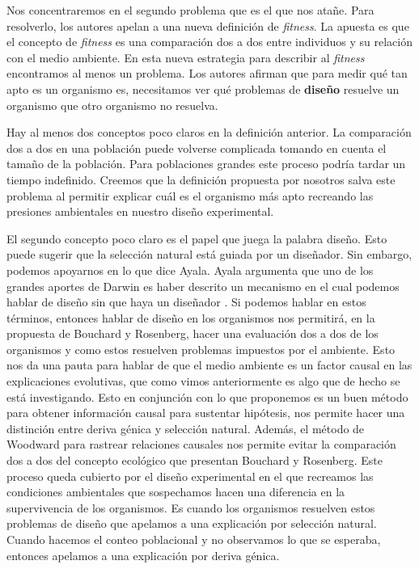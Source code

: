 Nos concentraremos en el segundo problema que es el que nos atañe. Para resolverlo, los autores apelan a una nueva definición de \emph{fitness}. La apuesta es que el concepto de \emph{fitness} es una comparación dos a dos entre individuos y su relación con el medio ambiente. En esta nueva estrategia para describir al \emph{fitness} encontramos al menos un problema. Los autores afirman que para medir qué tan apto es un organismo es, necesitamos ver qué problemas de \textbf{diseño} resuelve un organismo que otro organismo no resuelva.

Hay al menos dos conceptos poco claros en la definición anterior. La comparación dos a dos en una población puede volverse complicada tomando en cuenta el tamaño de la población. Para poblaciones grandes este proceso podría tardar un tiempo indefinido. Creemos que la definición propuesta por nosotros salva este problema al permitir explicar cuál es el organismo más apto recreando las presiones ambientales en nuestro diseño experimental.

El segundo concepto poco claro es el papel que juega la palabra diseño. Esto puede sugerir que la selección natural está guiada por un diseñador. Sin embargo, podemos apoyarnos en lo que dice Ayala. Ayala argumenta que uno de los grandes aportes de Darwin es haber descrito un mecanismo en el cual podemos hablar de diseño sin que haya un diseñador \cite{Ayala2004}. Si podemos hablar en estos términos, entonces hablar de diseño en los organismos nos permitirá, en la propuesta de Bouchard y Rosenberg, hacer una evaluación dos a dos de los organismos y como estos resuelven problemas impuestos por el ambiente. Esto nos da una pauta para hablar de que el medio ambiente es un factor causal en las explicaciones evolutivas, que como vimos anteriormente es algo que de hecho se está investigando. Esto en conjunción con lo que proponemos es un buen método para obtener información causal para sustentar hipótesis, nos permite hacer una distinción entre deriva génica y selección natural. Además, el método de Woodward para rastrear relaciones causales nos permite evitar la comparación dos a dos del concepto  ecológico que presentan Bouchard y Rosenberg. Este proceso queda cubierto por el diseño experimental en el que recreamos las condiciones ambientales que sospechamos hacen una diferencia en la supervivencia de los organismos. Es cuando los organismos resuelven estos problemas de diseño que apelamos a una explicación por selección natural. Cuando hacemos el conteo poblacional y no observamos lo que se esperaba, entonces apelamos a una explicación por deriva génica.

